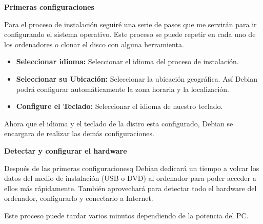				\textbf{Primeras configuraciones}\par
			
				Para el proceso de instalación seguiré una serie de pasos que me servirán para ir configurando el sistema operativo. Este proceso se puede repetir en cada uno de los ordenadores o clonar el disco con alguna herramienta.
				
				\vspace{0.2cm}
	 
				\begin{itemize}
				
					\item \textbf{Seleccionar idioma:} Seleccionar el idioma del proceso de instalación.
					
					\item \textbf{Seleccionar su Ubicación:} Seleccionar la ubicación geográfica. Así Debian podrá configurar automáticamente la zona horaria y la 	localización.	
				
					\item \textbf{Configure el Teclado:} Seleccionar el idioma de nuestro teclado.
							
				\end{itemize}
		
				\vspace{0.2cm}	
			
				Ahora que el idioma y el teclado de la distro esta configurado, Debian se encargara de realizar las demás configuraciones.
			
				\vspace{0.2cm}
			
				\textbf{Detectar y configurar el hardware}\par\vspace{0.2cm}
			
				Después de las primeras configuracionesq Debian dedicará un tiempo a volcar los datos del medio de instalación (USB o DVD) al ordenador para poder acceder a ellos más rápidamente. También aprovechará para detectar todo el hardware del ordenador, configurarlo y conectarlo a Internet.\par
				
				Este proceso puede tardar varios minutos dependiendo de la potencia del PC.\par
			
				\vspace{0.2cm}
			
